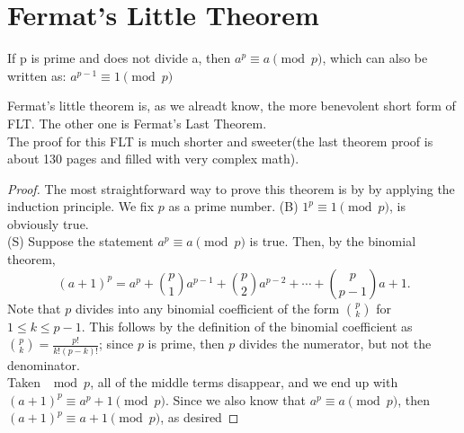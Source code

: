 \section{Fermat's Little Theorem}
\begin{theorem}
    If p is prime and does not divide a, then $a^p \equiv a \pmod{p}$, which can also be written as: $a^{p-1} \equiv 1 \pmod{p}$
\end{theorem}
Fermat's little theorem is, as we alreadt know, the more benevolent short form of FLT. The other one is Fermat's Last Theorem.\\
The proof for this FLT is much shorter and sweeter(the last theorem proof is about 130 pages and filled with very complex math).\\
\begin{proof}
    The most straightforward way to prove this theorem is by by applying the induction principle. We fix $p$ as a prime number. 
(B) $1^p \equiv 1 \pmod{p}$, is obviously true. \\
(S) Suppose the statement $a^p \equiv a \pmod{p}$ is true. Then, by the binomial theorem,\\
    \[(a+1)^p = a^p + {p \choose 1} a^{p-1} + {p \choose 2} a^{p-2} + \cdots + {p \choose p-1} a + 1.\]
    Note that $p$ divides into any binomial coefficient of the form ${p \choose k}$ for $1 \le k \le p-1$. This follows by the definition of the binomial coefficient as ${p \choose k} = \frac{p!}{k! (p-k)!}$; since $p$ is prime, then $p$ divides the numerator, but not the denominator.\\
    Taken $\mod p$, all of the middle terms disappear, and we end up with $(a+1)^p \equiv a^p + 1 \pmod{p}$. Since we also know that $a^p \equiv a\pmod{p}$, then $(a+1)^p \equiv a+1 \pmod{p}$, as desired
\end{proof}
